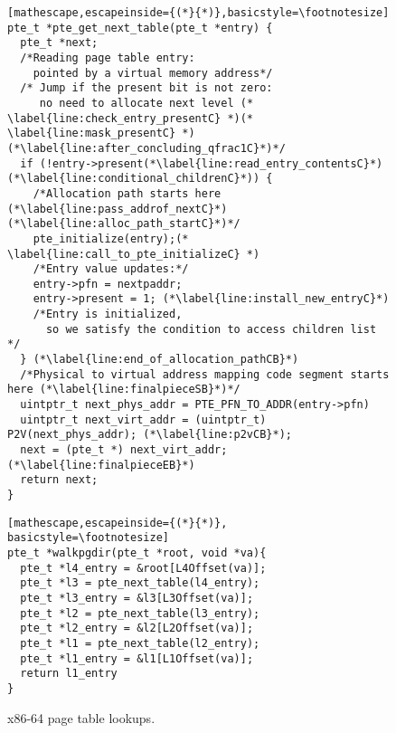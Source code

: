 \begin{figure}
\begin{subfigure}
\begin{tikzpicture}[x=0.75pt,y=0.75pt,yscale=-0.75,xscale=0.75]
\end{tikzpicture}
          \caption{Accessing to the Page Referenced by L1 Entry}
        \label{fig:enter-label}
    \end{subfigure}
    \vfill
\begin{minipage}{.5\textwidth}
\begin{lstlisting}[mathescape,escapeinside={(*}{*)},basicstyle=\footnotesize]
pte_t *pte_get_next_table(pte_t *entry) {
  pte_t *next;
  /*Reading page table entry:
    pointed by a virtual memory address*/
  /* Jump if the present bit is not zero:
     no need to allocate next level (* \label{line:check_entry_presentC} *)(* \label{line:mask_presentC} *)  (*\label{line:after_concluding_qfrac1C}*)*/
  if (!entry->present(*\label{line:read_entry_contentsC}*) (*\label{line:conditional_childrenC}*)) {
    /*Allocation path starts here (*\label{line:pass_addrof_nextC}*)(*\label{line:alloc_path_startC}*)*/
    pte_initialize(entry);(* \label{line:call_to_pte_initializeC} *)
    /*Entry value updates:*/
    entry->pfn = nextpaddr;
    entry->present = 1; (*\label{line:install_new_entryC}*)
    /*Entry is initialized,
      so we satisfy the condition to access children list */
  } (*\label{line:end_of_allocation_pathCB}*)
  /*Physical to virtual address mapping code segment starts here (*\label{line:finalpieceSB}*)*/
  uintptr_t next_phys_addr = PTE_PFN_TO_ADDR(entry->pfn)
  uintptr_t next_virt_addr = (uintptr_t) P2V(next_phys_addr); (*\label{line:p2vCB}*);
  next = (pte_t *) next_virt_addr;(*\label{line:finalpieceEB}*)
  return next;
}
\end{lstlisting}
\end{minipage}
\hfill\hfill
\begin{minipage}{.4\textwidth}
\begin{lstlisting}[mathescape,escapeinside={(*}{*)}, basicstyle=\footnotesize]
pte_t *walkpgdir(pte_t *root, void *va){ 
  pte_t *l4_entry = &root[L4Offset(va)];
  pte_t *l3 = pte_next_table(l4_entry);
  pte_t *l3_entry = &l3[L3Offset(va)];
  pte_t *l2 = pte_next_table(l3_entry);
  pte_t *l2_entry = &l2[L2Offset(va)];  
  pte_t *l1 = pte_next_table(l2_entry);
  pte_t *l1_entry = &l1[L1Offset(va)];  
  return l1_entry
}
\end{lstlisting}
\end{minipage}
    \vspace{-2.5em}
    \caption{x86-64 page table lookups.}
    \label{fig:pagetables}
    \vspace{-1em}
\end{figure}

